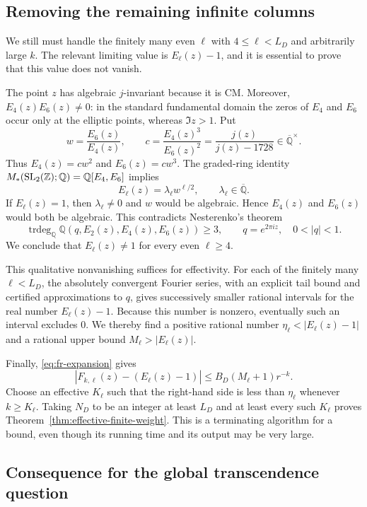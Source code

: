 \documentclass[11pt]{article}
\begin{document}
\subsection{Removing the remaining infinite columns}

We still must handle the finitely many even $\ell$ with
$4\leq\ell<L_D$ and arbitrarily large $k$.  The relevant limiting
value is $E_\ell(z)-1$, and it is essential to prove that this value
does not vanish.

The point $z$ has algebraic $j$-invariant because it is CM.  Moreover,
$E_4(z)E_6(z)\ne0$: in the standard fundamental domain the zeros of
$E_4$ and $E_6$ occur only at the elliptic points, whereas $\Im z>1$.
Put
\[
 w=\frac{E_6(z)}{E_4(z)},\qquad
 c=\frac{E_4(z)^3}{E_6(z)^2}
   =\frac{j(z)}{j(z)-1728}\in\overline{\mathbb Q}^{\times}.
\]
Thus $E_4(z)=cw^2$ and $E_6(z)=cw^3$.  The graded-ring identity
$M_*({\rm SL}_2(\mathbb Z);\mathbb Q)=\mathbb Q[E_4,E_6]$
implies
\[
 E_\ell(z)=\lambda_\ell w^{\ell/2},\qquad
 \lambda_\ell\in\overline{\mathbb Q}.
\]
If $E_\ell(z)=1$, then $\lambda_\ell\ne0$ and $w$ would be
algebraic.  Hence $E_4(z)$ and $E_6(z)$ would both be algebraic.
This contradicts Nesterenko's theorem \cite{Nesterenko}
\[
 \operatorname{trdeg}_{\mathbb Q}
 \mathbb Q(q,E_2(z),E_4(z),E_6(z))\geq3,
 \qquad q=e^{2\pi iz},\quad 0<|q|<1.
\]
We conclude that $E_\ell(z)\ne1$ for every even $\ell\geq4$.

This qualitative nonvanishing suffices for effectivity.  For each of
the finitely many $\ell<L_D$, the absolutely convergent Fourier series,
with an explicit tail bound and certified approximations to $q$, gives
successively smaller rational intervals for the real number
$E_\ell(z)-1$.  Because this number is nonzero, eventually such an
interval excludes $0$.  We thereby find a positive rational number
$\eta_\ell<|E_\ell(z)-1|$ and a rational upper bound
$M_\ell>|E_\ell(z)|$.

Finally, \eqref{eq:fr-expansion} gives
\[
 \left|F_{k,\ell}(z)-(E_\ell(z)-1)\right|
 \leq B_D(M_\ell+1)r^{-k}.
\]
Choose an effective $K_\ell$ such that the right-hand side is less
than $\eta_\ell$ whenever $k\geq K_\ell$.  Taking $N_D$ to be
an integer at least $L_D$ and at least every such $K_\ell$ proves
Theorem~\ref{thm:effective-finite-weight}.  This is a terminating
algorithm for a bound, even though its running time and its output may
be very large.

\subsection{Consequence for the global transcendence question}
\end{document}
